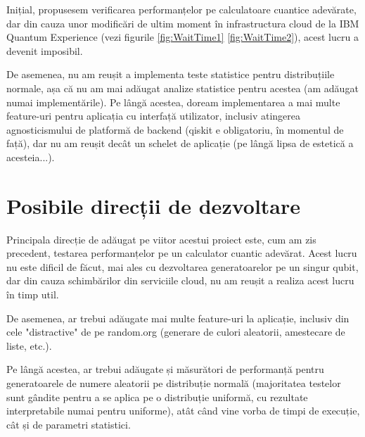 Inițial, propusesem verificarea performanțelor pe calculatoare cuantice adevărate, dar din cauza unor modificări de ultim moment în infrastructura cloud de la IBM Quantum Experience (vezi figurile \ref{fig:WaitTime1} \ref{fig:WaitTime2}), acest lucru a devenit imposibil. 

De asemenea, nu am reușit a implementa teste statistice pentru distribuțiile normale, așa că nu am mai adăugat analize statistice pentru acestea (am adăugat numai implementările).
Pe lângă acestea, doream implementarea a mai multe feature-uri pentru aplicația cu interfață utilizator, inclusiv atingerea agnosticismului de platformă de backend (qiskit e obligatoriu, în momentul de față), dar nu am reușit decât un schelet de aplicație (pe lângă lipsa de estetică a acesteia...).

\section*{Posibile direcții de dezvoltare}

Principala direcție de adăugat pe viitor acestui proiect este, cum am zis precedent, testarea performanțelor pe un calculator cuantic adevărat. Acest lucru nu este dificil de făcut, mai ales cu dezvoltarea generatoarelor pe un singur qubit, dar din cauza schimbărilor din serviciile cloud, nu am reușit a realiza acest lucru în timp util.

De asemenea, ar trebui adăugate mai multe feature-uri la aplicație, inclusiv din cele "distractive" de pe random.org (generare de culori aleatorii, amestecare de liste, etc.).

Pe lângă acestea, ar trebui adăugate și măsurători de performanță pentru generatoarele de numere aleatorii pe distribuție normală (majoritatea testelor sunt gândite pentru a se aplica pe o distribuție uniformă, cu rezultate interpretabile numai pentru uniforme), atât când vine vorba de timpi de execuție, cât și de parametri statistici.

